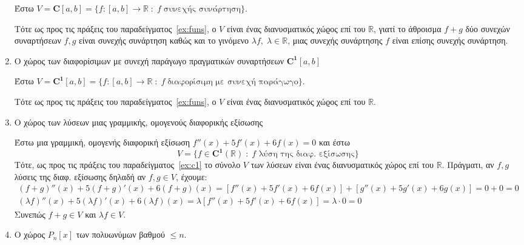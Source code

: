 \begin{examples}
\begin{enumerate}
            Έστω $ V = \mathbf{C}{[a,b]} = \{ f \colon [a,b] \to \mathbb{R} \; 
            : \; f \; \text{συνεχής συνάρτηση} \}  $. 

            Τότε ως προς τις πράξεις του 
            παραδείγματος~\ref{ex:funs}, ο $V$ είναι ένας διανυσματικός χώϱος 
            επί του $ \mathbb{R} $, 
            γιατί το άθροισμα $ f+g $ δύο συνεχών συναρτήσεων $ f,g $ είναι 
            συνεχής συνάρτηση καθώς και το γινόμενο 
            $ \lambda f, \; \lambda \in \mathbb{R} $, μιας συνεχής συνάρτησης 
            $f$ είναι επίσης συνεχής συνάρτηση. 

        \item \label{ex:c1} \textcolor{Col2}{Ο χώρος των διαφορίσιμων με 
            συνεχή παράγωγο πραγματικών συναρτήσεων $ \mathbf{C^{1}}[a,b] $} 

            Έστω $ V = \mathbf{C^{1}}{[a,b]} = \{ f \colon [a,b] \to \mathbb{R} \; 
            : \; f \; \text{διαφορίσιμη με συνεχή παράγωγο} \}  $. 

            Τότε ως προς τις πράξεις του 
            παραδείγματος~\ref{ex:funs}, ο $V$ είναι ένας διανυσματικός χώϱος 
            επί του $ \mathbb{R} $. 

        \item \textcolor{Col2}{Ο χώρος των λύσεων μιας γραμμικής, ομογενούς 
            διαφορικής εξίσωσης}

            Έστω μια γραμμική, ομογενής διαφορική εξίσωση $ f''(x)+5f'(x)+6f(x)=0 $ 
            και έστω 
            \[
                V = \{ f \in \mathbf{C^{1}}(\mathbb{R}) \; : \; 
                \text{$f$ λύση της διαφ. εξίσωσης} \} 
            \] 
            Τότε, ως προς τις πράξεις του παραδείγματος~\ref{ex:c1} το 
            σύνολο $ V $ των λύσεων είναι ένας διανυσματικός χώρος επί του
            $ \mathbb{R} $. Πράγματι, αν $ f,g $ λύσεις της διαφ. εξίσωσης
            δηλαδή αν $ f,g \in V $, έχουμε:
            \begin{gather*}
                (f+g)''(x)+5(f+g)'(x)+6(f+g)(x) = [f''(x)+5f'(x)+6f(x)] 
                + [g''(x)+5g'(x)+6g(x)] = 0+0=0 \\
                (\lambda f)''(x) + 5(\lambda f)'(x)+6(\lambda f)(x)= \lambda
                [f''(x)+5f'(x)+6f(x)] = \lambda \cdot 0=0
            \end{gather*}
            Συνεπώς $ f+g \in V $ και $ \lambda f \in V $. 

        \item \textcolor{Col2}{Ο χώρος $ P_{n}[x] $ των πολυωνύμων βαθμού 
            $ \leq n $}.


\end{enumerate}
\end{examples}
